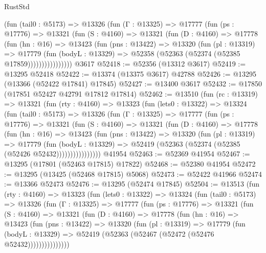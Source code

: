 \begin{lexlean}{RustStd}
\begin{coremodule}
            (fun (tail0 : @5173) =>
            @13326
              (fun (Γ : @13325) =>
              @17777
                (fun (ps : @17776) =>
                @13321
                  (fun (S : @4160) =>
                  @13321
                    (fun (D : @4160) =>
                    @17778
                      (fun (hn : @16) =>
                      @13423
                        (fun (pns : @13422) =>
                        @13320
                          (fun (pl : @13319) =>
                          @17779
                            (fun (bodyL : @13329) =>
                            @52358 (@52363 (@52374 (@52385 @17859))))))))))))))))
    @3617
@52418 := @52356 (@13312 @3617)
@52419 := @13295 @52418
@52422 := @13374 (@13375 @3617) @42788
@52426 := @13295 (@13366 (@52422 @17841) @17845)
@52427 := @13400 @3617
@52432 := @17850 (@17851 @52427 @42791 @17812 @17814)
@52462 := @13510
    (fun (rc : @13319) =>
    @13321
      (fun (rty : @4160) =>
      @13323
        (fun (lets0 : @13322) =>
        @13324
          (fun (tail0 : @5173) =>
          @13326
            (fun (Γ : @13325) =>
            @17777
              (fun (ps : @17776) =>
              @13321
                (fun (S : @4160) =>
                @13321
                  (fun (D : @4160) =>
                  @17778
                    (fun (hn : @16) =>
                    @13423
                      (fun (pns : @13422) =>
                      @13320
                        (fun (pl : @13319) =>
                        @17779
                          (fun (bodyL : @13329) =>
                          @52419 (@52363 (@52374 (@52385 (@52426 @52432))))))))))))))))
    @41954
@52463 := @52369 @41954
@52467 := @13295 (@17801 (@52463 @17815) @17822)
@52468 := @52380 @41954
@52472 := @13295 (@13425 (@52468 @17815) @5068)
@52473 := @52422 @41966
@52474 := @13366 @52473
@52476 := @13295 (@52474 @17845)
@52504 := @13513
    (fun (rty : @4160) =>
    @13323
      (fun (lets0 : @13322) =>
      @13324
        (fun (tail0 : @5173) =>
        @13326
          (fun (Γ : @13325) =>
          @17777
            (fun (ps : @17776) =>
            @13321
              (fun (S : @4160) =>
              @13321
                (fun (D : @4160) =>
                @17778
                  (fun (hn : @16) =>
                  @13423
                    (fun (pns : @13422) =>
                    @13320
                      (fun (pl : @13319) =>
                      @17779
                        (fun (bodyL : @13329) =>
                        @52419 (@52363 (@52467 (@52472 (@52476 @52432)))))))))))))))

\end{coremodule}
\end{lexlean}
